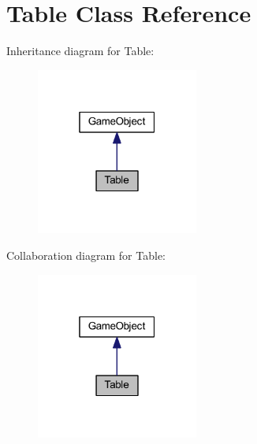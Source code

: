 \hypertarget{class_table}{\section{Table Class Reference}
\label{class_table}
}


Inheritance diagram for Table\+:\nopagebreak
\begin{figure}[H]
\begin{center}
\leavevmode
\includegraphics[width=151pt]{class_table__inherit__graph}
\end{center}
\end{figure}


Collaboration diagram for Table\+:\nopagebreak
\begin{figure}[H]
\begin{center}
\leavevmode
\includegraphics[width=151pt]{class_table__coll__graph}
\end{center}
\end{figure}
